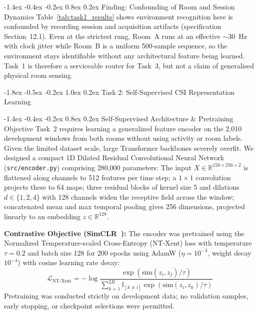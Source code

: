 \documentclass[10pt,a4paper]{article}
\makeatletter
\renewcommand{\section}{\@startsection{section}{1}{\z@}%
  {-1.8ex \@plus -0.5ex \@minus -0.2ex}%
  {1.0ex \@plus 0.2ex}%
  {\normalfont\large\bfseries\color{primary}}}
\renewcommand{\subsection}{\@startsection{subsection}{2}{\z@}%
  {-1.4ex \@plus -0.4ex \@minus -0.2ex}%
  {0.8ex \@plus 0.2ex}%
  {\normalfont\normalsize\bfseries\color{secondary}}}
\makeatother
\begin{document}
\subsection{Finding: Confounding of Room and Session Dynamics}
Table~\ref{tab:task1_results} shows environment recognition here is confounded by recording session and acquisition artifacts (specification Section~12.1). Even at the strictest rung, Room~A runs at an effective $\sim$30~Hz with clock jitter while Room~B is a uniform 500-sample sequence, so the environment stays identifiable without any architectural feature being learned. Task~1 is therefore a serviceable router for Task~3, but not a claim of generalised physical room sensing.

\section{Task 2: Self-Supervised CSI Representation Learning}
\label{sec:task2}

\subsection{Self-Supervised Architecture \& Pretraining Objective}
Task~2 requires learning a generalized feature encoder on the 2,010 development windows from both rooms without using activity or room labels. Given the limited dataset scale, large Transformer backbones severely overfit. We designed a compact 1D Dilated Residual Convolutional Neural Network (\texttt{src/encoder.py}) comprising 280,000 parameters:
The input $X \in \mathbb{R}^{150 \times 256 \times 2}$ is flattened along channels to 512 features per time step; a $1\times1$ convolution projects these to 64 maps; three residual blocks of kernel size 5 and dilations $d \in \{1,2,4\}$ with 128 channels widen the receptive field across the window; concatenated mean and max temporal pooling gives 256 dimensions, projected linearly to an embedding $z \in \mathbb{R}^{128}$.

\noindent\textbf{Contrastive Objective (SimCLR~\cite{chen2020simple}):} The encoder was pretrained using the Normalized Temperature-scaled Cross-Entropy (NT-Xent) loss with temperature $\tau = 0.2$ and batch size 128 for 200 epochs using AdamW ($\eta = 10^{-3}$, weight decay $10^{-4}$) with cosine learning rate decay:
\begin{equation}
    \mathcal{L}_{\text{NT-Xent}} = -\log \frac{\exp(\text{sim}(z_i, z_j) / \tau)}{\sum_{k=1}^{2B} \mathbb{I}_{[k \ne i]} \exp(\text{sim}(z_i, z_k) / \tau)}
\end{equation}
Pretraining was conducted strictly on development data; no validation samples, early stopping, or checkpoint selections were permitted.
\end{document}
